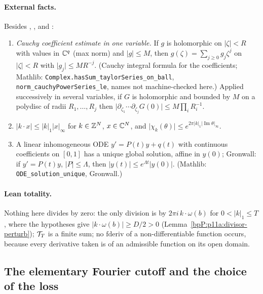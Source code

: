 \paragraph{External facts.} Besides , ,  and :
\begin{enumerate}[label=(X\arabic*),ref=(X\arabic*)]
\item\label{bpP:p11a:x-cauchy} \emph{Cauchy coefficient estimate in one variable.} If $g$ is holomorphic on $\lvert\zeta\rvert<R$ with values in $\mathbb{C}^q$ (max norm) and $\lvert g\rvert\le M$, then $g(\zeta)=\sum_{j\ge0}g_j\zeta^j$ on $\lvert\zeta\rvert<R$ with $\lvert g_j\rvert\le MR^{-j}$. (Cauchy integral formula for the coefficients; Mathlib: \nolinkurl{Complex.hasSum_taylorSeries_on_ball}, \nolinkurl{norm_cauchyPowerSeries_le}, names not machine-checked here.) Applied successively in several variables, if $G$ is holomorphic and bounded by $M$ on a polydisc of radii $R_1,\dots,R_j$ then $\lvert\partial_{\zeta_1}\cdots\partial_{\zeta_j}G(0)\rvert\le M\prod_iR_i^{-1}$.
\item\label{bpP:p11a:x-duality} $\lvert k\cdot x\rvert\le\lvert k\rvert_1\lvert x\rvert_\infty$ for $k\in\mathbb{Z}^N$, $x\in\mathbb{C}^N$, and $\lvert\chi_k(\theta)\rvert\le e^{2\pi\lvert k\rvert_1\lvert\operatorname{Im}\theta\rvert_\infty}$.
\item\label{bpP:p11a:x-ode} A linear inhomogeneous ODE $y'=P(t)y+q(t)$ with continuous coefficients on $[0,1]$ has a unique global solution, affine in $y(0)$; Gronwall: if $y'=P(t)y$, $\lvert P\rvert\le\Lambda$, then $\lvert y(t)\rvert\le e^{\Lambda t}\lvert y(0)\rvert$. (Mathlib: \nolinkurl{ODE_solution_unique}, Gronwall.)
\end{enumerate}

\paragraph{Lean totality.} Nothing here divides by zero: the only division is by $2\pi i\,k\cdot\omega(b)$ for $0<\lvert k\rvert_1\le T$, where the hypotheses give $\lvert k\cdot\omega(b)\rvert\ge D/2>0$ (Lemma~\ref{bpP:p11a:divisor-perturb}); $\mathcal T_T$ is a finite sum; no $\mathrm{fderiv}$ of a non-differentiable function occurs, because every derivative taken is of an admissible function on its open domain.

\subsection{The elementary Fourier cutoff and the choice of the loss}\label{bpP:p11a:sec-fourier}

